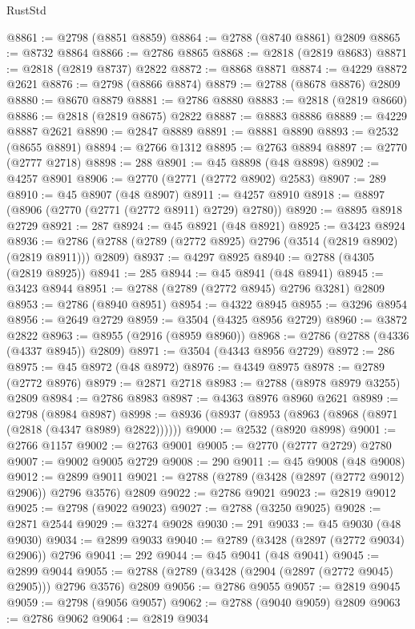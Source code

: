 \begin{lexlean}{RustStd}
\begin{coremodule}
@8861 := @2798 (@8851 @8859)
@8864 := @2788 (@8740 @8861) @2809
@8865 := @8732 @8864
@8866 := @2786 @8865
@8868 := @2818 (@2819 @8683)
@8871 := @2818 (@2819 @8737) @2822
@8872 := @8868 @8871
@8874 := @4229 @8872 @2621
@8876 := @2798 (@8866 @8874)
@8879 := @2788 (@8678 @8876) @2809
@8880 := @8670 @8879
@8881 := @2786 @8880
@8883 := @2818 (@2819 @8660)
@8886 := @2818 (@2819 @8675) @2822
@8887 := @8883 @8886
@8889 := @4229 @8887 @2621
@8890 := @2847 @8889
@8891 := @8881 @8890
@8893 := @2532 (@8655 @8891)
@8894 := @2766 @1312
@8895 := @2763 @8894
@8897 := @2770 (@2777 @2718)
@8898 := 288
@8901 := @45 @8898 (@48 @8898)
@8902 := @4257 @8901
@8906 := @2770 (@2771 (@2772 @8902) @2583)
@8907 := 289
@8910 := @45 @8907 (@48 @8907)
@8911 := @4257 @8910
@8918 := @8897 (@8906 (@2770 (@2771 (@2772 @8911) @2729) @2780))
@8920 := @8895 @8918 @2729
@8921 := 287
@8924 := @45 @8921 (@48 @8921)
@8925 := @3423 @8924
@8936 := @2786 (@2788 (@2789 (@2772 @8925) @2796 (@3514 (@2819 @8902) (@2819 @8911))) @2809)
@8937 := @4297 @8925
@8940 := @2788 (@4305 (@2819 @8925))
@8941 := 285
@8944 := @45 @8941 (@48 @8941)
@8945 := @3423 @8944
@8951 := @2788 (@2789 (@2772 @8945) @2796 @3281) @2809
@8953 := @2786 (@8940 @8951)
@8954 := @4322 @8945
@8955 := @3296 @8954
@8956 := @2649 @2729
@8959 := @3504 (@4325 @8956 @2729)
@8960 := @3872 @2822
@8963 := @8955 (@2916 (@8959 @8960))
@8968 := @2786 (@2788 (@4336 (@4337 @8945)) @2809)
@8971 := @3504 (@4343 @8956 @2729)
@8972 := 286
@8975 := @45 @8972 (@48 @8972)
@8976 := @4349 @8975
@8978 := @2789 (@2772 @8976)
@8979 := @2871 @2718
@8983 := @2788 (@8978 @8979 @3255) @2809
@8984 := @2786 @8983
@8987 := @4363 @8976 @8960 @2621
@8989 := @2798 (@8984 @8987)
@8998 := @8936 (@8937 (@8953 (@8963 (@8968 (@8971 (@2818 (@4347 @8989) @2822))))))
@9000 := @2532 (@8920 @8998)
@9001 := @2766 @1157
@9002 := @2763 @9001
@9005 := @2770 (@2777 @2729) @2780
@9007 := @9002 @9005 @2729
@9008 := 290
@9011 := @45 @9008 (@48 @9008)
@9012 := @2899 @9011
@9021 := @2788 (@2789 (@3428 (@2897 (@2772 @9012) @2906)) @2796 @3576) @2809
@9022 := @2786 @9021
@9023 := @2819 @9012
@9025 := @2798 (@9022 @9023)
@9027 := @2788 (@3250 @9025)
@9028 := @2871 @2544
@9029 := @3274 @9028
@9030 := 291
@9033 := @45 @9030 (@48 @9030)
@9034 := @2899 @9033
@9040 := @2789 (@3428 (@2897 (@2772 @9034) @2906)) @2796
@9041 := 292
@9044 := @45 @9041 (@48 @9041)
@9045 := @2899 @9044
@9055 := @2788 (@2789 (@3428 (@2904 (@2897 (@2772 @9045) @2905))) @2796 @3576) @2809
@9056 := @2786 @9055
@9057 := @2819 @9045
@9059 := @2798 (@9056 @9057)
@9062 := @2788 (@9040 @9059) @2809
@9063 := @2786 @9062
@9064 := @2819 @9034

\end{coremodule}
\end{lexlean}
